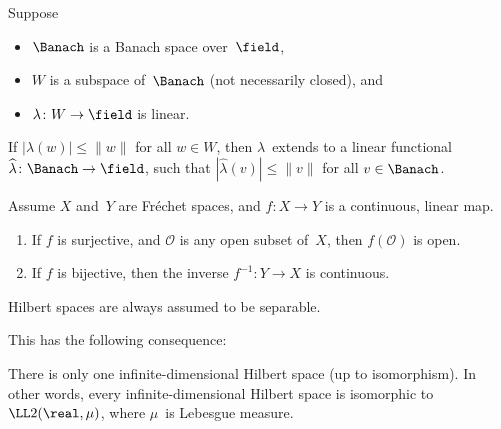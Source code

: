 \begin{prop}
Suppose 
	\begin{itemize}
	\item $\Banach$ is a Banach space over~$\field$,
	\item $W$ is a subspace of~$\Banach$  \textup(not necessarily closed\/\textup),
	and
	\item $\lambda \colon W \to \field$ is linear.
	\end{itemize}
If\/ $|\lambda(w)| \le \|w\|$ for all $w \in W$, then $\lambda$~extends to a linear functional $\widehat \lambda \colon \Banach \to \field$, such that $|\widehat \lambda(v)| \le \|v\|$ for all $v \in \Banach$.
\end{prop}

\begin{prop} \label{OpenMappingThm}
Assume $X$ and~$Y$ are Fréchet spaces, and $f \colon X \to Y$ is a continuous, linear map.
	\begin{enumerate}
	\item \label{OpenMappingThm-surj}
	If $f$ is surjective, and $\mathcal{O}$ is any open subset of~$X$, then $f(\mathcal{O})$ is open.
	\item \label{OpenMappingThm-bij}
	If $f$ is bijective, then the inverse $f^{-1} \colon Y \to X$ is continuous.
	\end{enumerate} 
\end{prop}

\begin{assump} \label{HilbertSpaceSeparable}
Hilbert spaces are always assumed to be separable.
\end{assump}

This has the following consequence:

\begin{prop}
There is only one infinite-dimensional Hilbert space\/ \textup(up to isomorphism\/\textup). In other words, every infinite-dimensional Hilbert space is isomorphic to $\LL2(\real, \mu)$, where $\mu$~is Lebesgue measure.
\end{prop}

